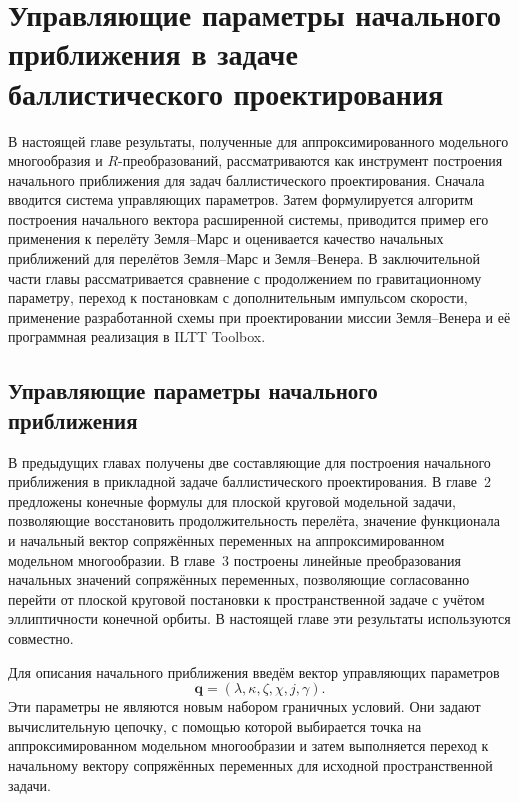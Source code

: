 \chapter{Управляющие параметры начального приближения в задаче баллистического проектирования}

В настоящей главе результаты, полученные для аппроксимированного модельного многообразия и \(R\)-преобразований, рассматриваются как инструмент построения начального приближения для задач баллистического проектирования. Сначала вводится система управляющих параметров. Затем формулируется алгоритм построения начального вектора расширенной системы, приводится пример его применения к перелёту Земля--Марс и оценивается качество начальных приближений для перелётов Земля--Марс и Земля--Венера. В заключительной части главы рассматривается сравнение с продолжением по гравитационному параметру, переход к постановкам с дополнительным импульсом скорости, применение разработанной схемы при проектировании миссии Земля--Венера и её программная реализация в ILTT Toolbox.

\section{Управляющие параметры начального приближения}

В предыдущих главах получены две составляющие для построения начального приближения в прикладной задаче баллистического проектирования. В главе~2 предложены конечные формулы для плоской круговой модельной задачи, позволяющие восстановить продолжительность перелёта, значение функционала и начальный вектор сопряжённых переменных на аппроксимированном модельном многообразии. В главе~3 построены линейные преобразования начальных значений сопряжённых переменных, позволяющие согласованно перейти от плоской круговой постановки к пространственной задаче с учётом эллиптичности конечной орбиты. В настоящей главе эти результаты используются совместно.

Для описания начального приближения введём вектор управляющих параметров
\begin{equation}
	\mathbf q =
	\left(
	\lambda,\kappa,\zeta,\chi,j,\gamma
	\right).
\end{equation}
Эти параметры не являются новым набором граничных условий. Они задают вычислительную цепочку, с помощью которой выбирается точка на аппроксимированном модельном многообразии и затем выполняется переход к начальному вектору сопряжённых переменных для исходной пространственной задачи.

